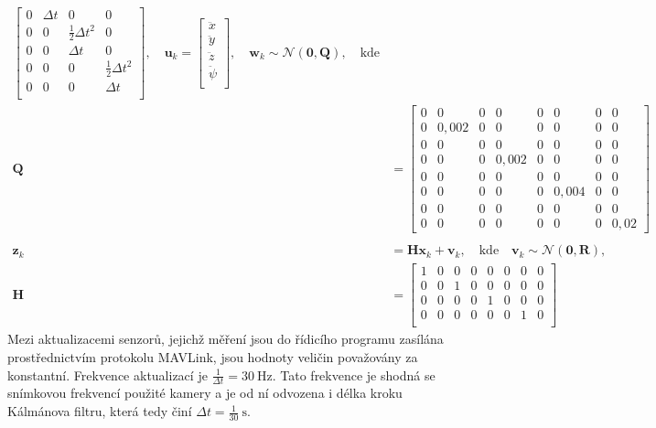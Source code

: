 \begin{align}
\begin{bmatrix}
                0 & \Delta t & 0 & 0 \\
                0 & 0 & \frac{1}{2}\Delta t^2 & 0 \\
                0 & 0 & \Delta t & 0 \\
                0 & 0 & 0 & \frac{1}{2}\Delta t^2 \\
                0 & 0 & 0 & \Delta t \\
            \end{bmatrix}, \quad \mathbf{u}_k = \begin{bmatrix}
                \ddot x \\
                \ddot y \\
                \ddot z \\
                \ddot \psi \\
            \end{bmatrix}, \quad \mathbf{w}_k \sim \mathcal{N}(\mathbf{0},\mathbf{Q}),\quad\mathrm{kde}\nonumber\\
            \mathbf{Q} &= \begin{bmatrix}
                0 & 0       & 0 & 0       & 0 & 0       & 0 & 0\\
                0 & 0{,}002 & 0 & 0       & 0 & 0       & 0 & 0\\
                0 & 0       & 0 & 0       & 0 & 0       & 0 & 0\\
                0 & 0       & 0 & 0{,}002 & 0 & 0       & 0 & 0\\
                0 & 0       & 0 & 0       & 0 & 0       & 0 & 0\\
                0 & 0       & 0 & 0       & 0 & 0{,}004 & 0 & 0\\
                0 & 0       & 0 & 0       & 0 & 0       & 0 & 0\\
                0 & 0       & 0 & 0       & 0 & 0       & 0 & 0{,}02
            \end{bmatrix} \nonumber \\ \nonumber \\
            \mathbf z_k &= \mathbf{Hx}_k + \mathbf{v}_k, \quad \mathrm{kde} \quad \mathbf{v}_k \sim \mathcal{N}(\mathbf{0},\mathbf{R}), \label{eq:kalmanz}\\
            \mathbf H &= \begin{bmatrix}
                1 & 0 & 0 & 0 & 0 & 0 & 0 & 0\\
                0 & 0 & 1 & 0 & 0 & 0 & 0 & 0\\
                0 & 0 & 0 & 0 & 1 & 0 & 0 & 0\\
                0 & 0 & 0 & 0 & 0 & 0 & 1 & 0\\
            \end{bmatrix} \nonumber
        \end{align}
        Mezi aktualizacemi senzorů, jejichž měření jsou do řídicího programu zasílána prostřednictvím protokolu MAVLink, jsou hodnoty veličin považovány za konstantní. Frekvence aktualizací je $\frac{1}{\Delta t} = 30~\mathrm{Hz}$. Tato frekvence je shodná se snímkovou frekvencí použité kamery a je od ní odvozena i délka kroku Kálmánova filtru, která tedy činí $\Delta t=\frac{1}{30}~\mathrm{s}$.
